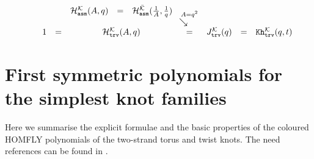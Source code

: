 \documentclass[11pt]{article}
\def\Hm{\mathcal{H}}
\def\Km{\mathcal{K}}
\def\Kh{\mathtt{Kh}}
\def\Tor{\mathtt{Tor}}
\def\Tw{\mathtt{Tw}}
\def\sym{\mathtt{sym}}
\def\asm{\mathtt{asm}}
\def\adj{\mathtt{adj}}
\def\trv{\mathtt{trv}}
\begin{document}
\begin{table}
$$\begin{array}{ccccccccccccccc}
	&&&&\Hm_{\asm}^{\Km}(A,q)&=&\Hm_{\asm}^{\bar{\Km}}(\frac{1}{A},\frac{1}{q})&\\[-3mm]
	&&&&&&&\hspace{-5mm}\stackrel{\hspace{5mm}A=q^2}{\searrow}&\\
	&&1&=&\multicolumn{3}{c}{\Hm^{\Km}_{\trv}(A,q)}&=&\multicolumn{3}{c}{J^{\Km}_{\trv}(q)}&=&\multicolumn{3}{c}{\Kh^{\Km}_{\trv}(q,t)}
	\end{array}
	$$
\end{table}

\section{First symmetric polynomials for the simplest knot families}
Here we summarise the explicit formulae and the basic properties of the coloured HOMFLY polynomials of the two-strand torus and twist knots. The need references can be found in \cite{knbook}.
\end{document}
